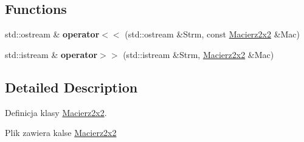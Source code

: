 \subsection*{Functions}
\begin{DoxyCompactItemize}
\item 
\hypertarget{_macierz2x2_8hh_aa3eba72acf9e09b901351ce2bc5edf2f}{std\+::ostream \& {\bfseries operator$<$$<$} (std\+::ostream \&Strm, const \hyperlink{class_macierz2x2}{Macierz2x2} \&Mac)}\label{_macierz2x2_8hh_aa3eba72acf9e09b901351ce2bc5edf2f}

\item 
\hypertarget{_macierz2x2_8hh_a41b60a94bb9873f185ec2fe49b19eed4}{std\+::istream \& {\bfseries operator$>$$>$} (std\+::istream \&Strm, \hyperlink{class_macierz2x2}{Macierz2x2} \&Mac)}\label{_macierz2x2_8hh_a41b60a94bb9873f185ec2fe49b19eed4}

\end{DoxyCompactItemize}


\subsection{Detailed Description}
Definicja klasy \hyperlink{class_macierz2x2}{Macierz2x2}. 

Plik zawiera kalse \hyperlink{class_macierz2x2}{Macierz2x2} 